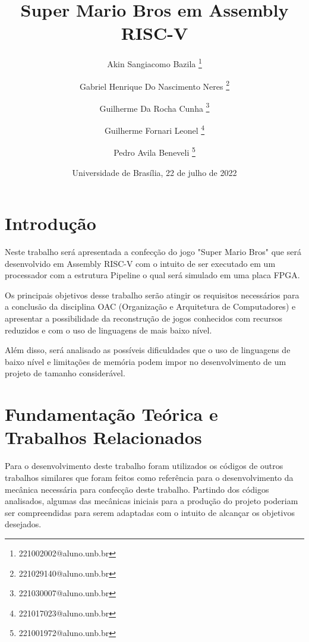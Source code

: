 \documentclass[11pt, twocolumn]{extarticle}
\title{\sffamily\bfseries
	Super Mario Bros em Assembly RISC-V
}
\author{%
	Akin Sangiacomo Bazila	\thanks{221002002@aluno.unb.br}	\and
	Gabriel Henrique Do Nascimento Neres	\thanks{221029140@aluno.unb.br} 	\and
	Guilherme Da Rocha Cunha 		\thanks{221030007@aluno.unb.br} 		\and
	Guilherme Fornari Leonel	\thanks{221017023@aluno.unb.br} \and
	Pedro Avila Beneveli	\thanks{221001972@aluno.unb.br}
}
\date{Universidade de Brasília, 22 de julho de 2022\\
}
\begin{document}
	\maketitle	%
	
\section{Introdução}
\indent \indent Neste trabalho será apresentada a confecção do jogo "Super Mario Bros" que será desenvolvido em Assembly RISC-V com o intuito de ser executado em um processador com a estrutura Pipeline o qual será simulado em uma placa FPGA.

Os principais objetivos desse trabalho serão atingir os requisitos necessários para a conclusão da disciplina OAC (Organização e Arquitetura de Computadores) e apresentar a possibilidade da reconstrução de jogos conhecidos com recursos reduzidos e com o uso de linguagens de mais baixo nível.

Além disso, será analisado as possíveis dificuldades que o uso de linguagens de baixo nível e limitações de memória podem impor no desenvolvimento de um projeto de tamanho considerável.

\section{Fundamentação Teórica e Trabalhos Relacionados}
\indent \indent Para o desenvolvimento deste trabalho foram utilizados os códigos de outros trabalhos similares que foram feitos como referência para o desenvolvimento da mecânica necessária para confecção deste trabalho. Partindo dos códigos analisados, algumas das mecânicas iniciais para a produção do projeto poderiam ser compreendidas para serem adaptadas com o intuito de alcançar os objetivos desejados.
\end{document}
